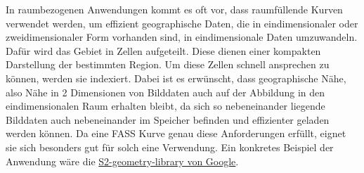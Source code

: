 \documentclass[course=erap]{aspdoc}
\begin{document}
In raumbezogenen Anwendungen kommt es oft vor, dass raumfüllende Kurven verwendet werden, um effizient geographische Daten, die in eindimensionaler oder zweidimensionaler Form vorhanden sind, in eindimensionale Daten umzuwandeln. \\Dafür wird das Gebiet in Zellen aufgeteilt. Diese dienen einer kompakten Darstellung der bestimmten Region. Um diese Zellen schnell ansprechen zu können, werden sie indexiert. Dabei ist es erwünscht, dass geographische Nähe, also Nähe in 2 Dimensionen von Bilddaten auch auf der Abbildung in den eindimensionalen Raum erhalten bleibt, da sich so nebeneinander liegende Bilddaten auch nebeneinander im Speicher befinden und effizienter geladen werden können.
Da eine FASS Kurve genau diese Anforderungen erfüllt, eignet sie sich besonders gut für solch eine Verwendung. Ein konkretes Beispiel der Anwendung wäre die \href{https://code.google.com/archive/p/s2-geometry-library/}{S2-geometry-library von Google}. 
\end{document}
